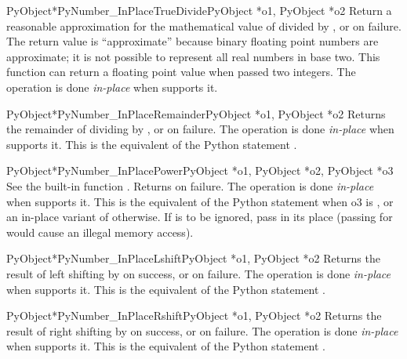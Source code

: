 \documentclass{manual}
\begin{document}
\begin{cfuncdesc}{PyObject*}{PyNumber_InPlaceTrueDivide}{PyObject *o1,
                                                         PyObject *o2}
Return a reasonable approximation for the mathematical value of
 divided by , or \NULL{} on failure.  The return value
is ``approximate'' because binary floating point numbers are
approximate; it is not possible to represent all real numbers in base
two.  This function can return a floating point value when passed two
integers.  The operation is done \emph{in-place} when 
supports it.
\end{cfuncdesc}


\begin{cfuncdesc}{PyObject*}{PyNumber_InPlaceRemainder}{PyObject *o1,
                                                        PyObject *o2}
Returns the remainder of dividing  by , or \NULL{} on
failure.  The operation is done \emph{in-place} when  supports it. 
This is the equivalent of the Python statement .
\end{cfuncdesc}


\begin{cfuncdesc}{PyObject*}{PyNumber_InPlacePower}{PyObject *o1,
                                                    PyObject *o2, PyObject *o3}
See the built-in function .  Returns
\NULL{} on failure.  The operation is done \emph{in-place} when
 supports it.  This is the equivalent of the Python statement
 when o3 is , or an
in-place variant of 
otherwise. If  is to be ignored, pass  in its
place (passing \NULL{} for  would cause an illegal memory
access).
\end{cfuncdesc}

\begin{cfuncdesc}{PyObject*}{PyNumber_InPlaceLshift}{PyObject *o1,
                                                     PyObject *o2}
Returns the result of left shifting  by  on success,
or \NULL{} on failure.  The operation is done \emph{in-place} when
 supports it.  This is the equivalent of the Python statement
.
\end{cfuncdesc}


\begin{cfuncdesc}{PyObject*}{PyNumber_InPlaceRshift}{PyObject *o1,
                                                     PyObject *o2}
Returns the result of right shifting  by  on success,
or \NULL{} on failure.  The operation is done \emph{in-place} when
 supports it.  This is the equivalent of the Python statement
.
\end{cfuncdesc}
\end{document}
